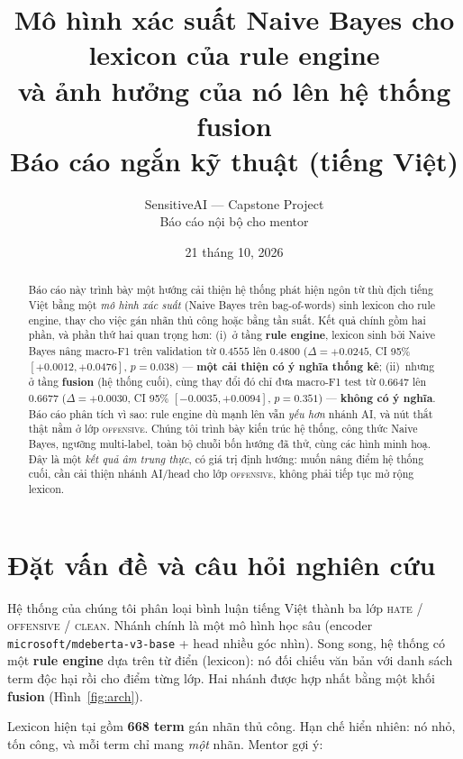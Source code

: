 \documentclass[11pt,a4paper]{article}
\title{\textbf{Mô hình xác suất Naive Bayes cho lexicon của rule engine\\
       và ảnh hưởng của nó lên hệ thống fusion}\\[0.4em]
       \large Báo cáo ngắn kỹ thuật (tiếng Việt)}
\author{SensitiveAI --- Capstone Project\\ \small Báo cáo nội bộ cho mentor}
\date{21 tháng 10, 2026}
\newcommand{\ok}[1]{\textcolor{cok}{\textbf{#1}}}
\newcommand{\bad}[1]{\textcolor{cfail}{\textbf{#1}}}
\newcommand{\code}[1]{\texttt{\small #1}}
\begin{document}
\maketitle

\begin{abstract}
\noindent
Báo cáo này trình bày một hướng cải thiện hệ thống phát hiện ngôn từ thù địch
tiếng Việt bằng một \emph{mô hình xác suất} (Naive Bayes trên bag-of-words) sinh
lexicon cho rule engine, thay cho việc gán nhãn thủ công hoặc bằng
tần suất.  Kết quả chính gồm hai phần, và phần thứ hai quan trọng hơn:
(i)~ở tầng \textbf{rule engine}, lexicon sinh bởi Naive Bayes nâng macro-F1 trên
validation từ $0.4555$ lên $0.4800$ ($\Delta=+0.0245$, CI 95\% $[+0.0012,+0.0476]$,
$p=0.038$) --- \ok{một cải thiện có ý nghĩa thống kê};
(ii)~nhưng ở tầng \textbf{fusion} (hệ thống cuối), cùng thay đổi đó chỉ đưa
macro-F1 test từ $0.6647$ lên $0.6677$ ($\Delta=+0.0030$, CI 95\%
$[-0.0035,+0.0094]$, $p=0.351$) --- \bad{không có ý nghĩa}.
Báo cáo phân tích vì sao: rule engine dù mạnh lên vẫn \emph{yếu hơn} nhánh AI,
và nút thắt thật nằm ở lớp \textsc{offensive}.  Chúng tôi trình bày kiến trúc
hệ thống, công thức Naive Bayes, ngưỡng multi-label, toàn bộ chuỗi bốn hướng đã
thử, cùng các hình minh hoạ.  Đây là một \emph{kết quả âm trung thực}, có giá
trị định hướng: muốn nâng điểm hệ thống cuối, cần cải thiện nhánh AI/head cho
lớp \textsc{offensive}, không phải tiếp tục mở rộng lexicon.
\end{abstract}

\section{Đặt vấn đề và câu hỏi nghiên cứu}
\label{sec:intro}

Hệ thống của chúng tôi phân loại bình luận tiếng Việt thành ba lớp
\textsc{hate} / \textsc{offensive} / \textsc{clean}.  Nhánh chính là một mô hình
học sâu (encoder \code{microsoft/mdeberta-v3-base} + head nhiều góc nhìn).
Song song, hệ thống có một \textbf{rule engine} dựa trên từ điển (lexicon): nó
đối chiếu văn bản với danh sách term độc hại rồi cho điểm từng lớp.  Hai nhánh
được hợp nhất bằng một khối \textbf{fusion} (Hình~\ref{fig:arch}).

Lexicon hiện tại gồm \textbf{668 term} gán nhãn thủ công.  Hạn chế hiển nhiên:
nó nhỏ, tốn công, và mỗi term chỉ mang \emph{một} nhãn.  Mentor gợi ý:
\end{document}
